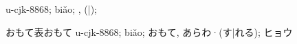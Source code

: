 
\cjkgGlue{} u-cjk-8868; biǎo; \cjkgGlue{}, \cjkgGlue{}\cjkgGlue{}(\cjkgGlue{}|\cjkgGlue{}); \cjkgGlue{}

{\mktsFontfileIpamp{}おもて表おもて u-cjk-8868; biǎo; おもて, あらわ·(す|れる); ヒョウ}

